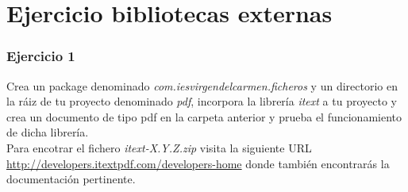 \documentclass[a4paper,spanish]{article}
\begin{document}
\section*{Ejercicio bibliotecas externas}
\subsubsection*{Ejercicio 1}
Crea un package denominado \emph{com.iesvirgendelcarmen.ficheros} y un directorio en la ráiz de tu proyecto denominado \emph{pdf}, incorpora la librería \emph{itext} a tu proyecto y crea un documento de tipo pdf en la carpeta anterior y prueba el funcionamiento de dicha librería.\\
Para encotrar el fichero \emph{itext-X.Y.Z.zip}  visita la siguiente URL \url{http://developers.itextpdf.com/developers-home} donde también encontrarás la documentación pertinente.
\end{document}
